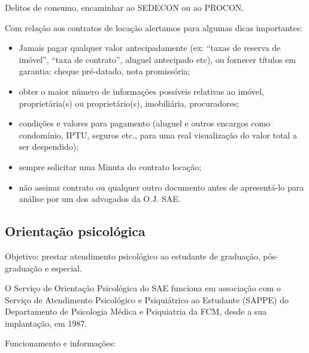 Delitos de consumo, encaminhar ao SEDECON ou ao PROCON.

Com relação aos contratos de locação alertamos para algumas dicas importantes:

\begin{itemize}
\item Jamais pagar qualquer valor antecipadamente (ex: ``taxas de reserva de
  imóvel'', ``taxa de contrato'', aluguel antecipado etc), ou fornecer títulos
  em garantia: cheque pré-datado, nota promissória;

\item obter o maior número de informações possíveis relativas ao imóvel,
  proprietária(s) ou proprietário(s), imobiliária, procuradores;

\item condições e valores para pagamento (aluguel e outros encargos como
  condomínio, IPTU, seguros etc., para uma real visualização do valor total a
  ser despendido);

\item sempre solicitar uma Minuta do contrato locação;

\item não assinar contrato ou qualquer outro documen\-to antes de apresentá-lo
  para análise por um dos advogados da O.J. SAE.
\end{itemize}

\subsection{Orientação psicológica}

Objetivo: prestar atendimento psicológico ao estudante de graduação,
pós-graduação e especial.

O Serviço de Orientação Psicológica do SAE funciona em associação com o Serviço
de Atendimento Psicológico e Psiquiátrico ao Estudante (SAPPE) do Departamento
de Psicologia Médica e Psiquiatria da FCM, desde a sua implantação, em 1987.

Funcionamento e informações:

